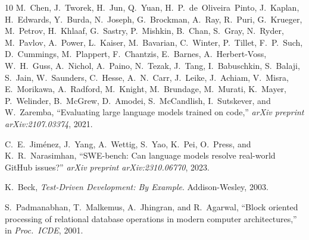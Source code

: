 \documentclass[conference]{IEEEtran}
\begin{document}
\begin{thebibliography}{10}
M.~Chen, J.~Tworek, H.~Jun, Q.~Yuan, H.~P.~de~Oliveira~Pinto, J.~Kaplan,
H.~Edwards, Y.~Burda, N.~Joseph, G.~Brockman, A.~Ray, R.~Puri, G.~Krueger,
M.~Petrov, H.~Khlaaf, G.~Sastry, P.~Mishkin, B.~Chan, S.~Gray,
N.~Ryder, M.~Pavlov, A.~Power, L.~Kaiser, M.~Bavarian, C.~Winter,
P.~Tillet, F.~P.~Such, D.~Cummings, M.~Plappert, F.~Chantzis, E.~Barnes,
A.~Herbert-Voss, W.~H.~Guss, A.~Nichol, A.~Paino, N.~Tezak, J.~Tang,
I.~Babuschkin, S.~Balaji, S.~Jain, W.~Saunders, C.~Hesse, A.~N.~Carr,
J.~Leike, J.~Achiam, V.~Misra, E.~Morikawa, A.~Radford, M.~Knight,
M.~Brundage, M.~Murati, K.~Mayer, P.~Welinder, B.~McGrew, D.~Amodei,
S.~McCandlish, I.~Sutskever, and W.~Zaremba,
``Evaluating large language models trained on code,''
\emph{arXiv preprint arXiv:2107.03374}, 2021.

C.~E.~Jim{\'e}nez, J.~Yang, A.~Wettig, S.~Yao, K.~Pei, O.~Press, and
K.~R.~Narasimhan,
``SWE-bench: Can language models resolve real-world GitHub issues?''
\emph{arXiv preprint arXiv:2310.06770}, 2023.

K.~Beck,
\emph{Test-Driven Development: By Example}.
Addison-Wesley, 2003.

S.~Padmanabhan, T.~Malkemus, A.~Jhingran, and R.~Agarwal,
``Block oriented processing of relational database operations in modern
computer architectures,''
in \emph{Proc.\ ICDE}, 2001.

\end{thebibliography}
\end{document}
